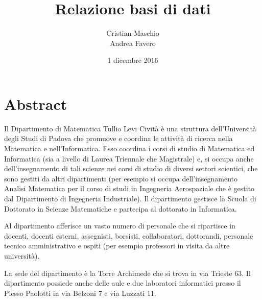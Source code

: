 \documentclass[a4paper, openany, 10pt]{book}
\begin{document}
\title{Relazione basi di dati}
\author{Cristian Maschio\\Andrea Favero}
\date{1 dicembre 2016}
\maketitle

\tableofcontents

\chapter{Abstract}
Il Dipartimento di Matematica Tullio Levi Cività è una struttura dell'Università degli Studi di Padova
che promuove e coordina le attività di ricerca nella Matematica e nell'Informatica. Esso coordina i
corsi di studio di Matematica ed Informatica (sia a livello di Laurea Triennale che Magistrale) e,
si occupa anche dell'insegnamento di tali scienze nei corsi di studio di diversi settori scientici, che
sono gestiti da altri dipartimenti (per esempio si occupa dell'insegnamento 
Analisi Matematica per il corso di studi in Ingegneria Aerospaziale che è gestito dal Dipartimento di Ingegneria Industriale).
Il dipartimento gestisce la Scuola di Dottorato in Scienze Matematiche e partecipa al dottorato in
Informatica. 

Al dipartimento afferisce un vasto numero di personale che si ripartisce in docenti, docenti esterni,
assegnisti, borsisti, collaboratori, dottorandi, personale tecnico amministrativo e ospiti (per esempio
professori in visita da altre università).

La sede del dipartimento è la Torre Archimede che si trova in via Trieste 63. Il dipartimento possiede
anche delle aule e due laboratori informatici presso il Plesso Paolotti in via Belzoni 7 e via Luzzati
11.
\end{document}
